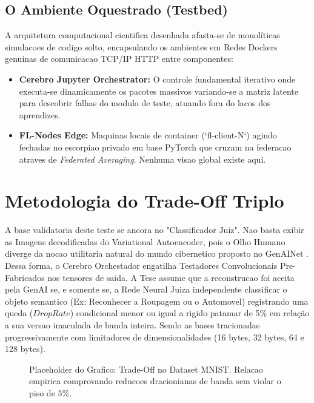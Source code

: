 \documentclass[conference]{IEEEtran}
\begin{document}
\subsection{O Ambiente Oquestrado (Testbed)}

A arquitetura computacional cientifica desenhada afasta-se de monolíticas simulacoes de codigo solto, encapsulando os ambientes em Redes Dockers genuinas de comunicacao TCP/IP HTTP entre componentes:
\begin{itemize}
    \item \textbf{Cerebro Jupyter Orchestrator:} O controle fundamental iterativo onde executa-se dinamicamente os pacotes massivos variando-se a matriz latente para descobrir falhas do modulo de teste, atuando fora do lacos dos aprendizes.
    \item \textbf{FL-Nodes Edge:} Maquinas locais de container (`fl-client-N`) agindo fechadas no escorpiao privado em base PyTorch que cruzam na federacao atraves de \textit{Federated Averaging}. Nenhuma visao global existe aqui.
\end{itemize}


\section{Metodologia do Trade-Off Triplo}

A base validatoria deste teste se ancora no "Classificador Juiz". Nao basta exibir as Imagens decodificadas do Variational Autoencoder, pois o Olho Humano diverge da nocao utilitaria natural do mundo cibernetico proposto no GenAINet \cite{du2023genainet}.
Dessa forma, o Cerebro Orchestador engatilha Testadores Convolucionais Pre-Fabricados nos tensores de saida. 
A Tese assume que a reconstrucao foi aceita pela GenAI se, e somente se, a Rede Neural Juiza independente classificar o objeto semantico (Ex: Reconhecer a Roupagem ou o Automovel) registrando uma queda ($Drop Rate$) condicional menor ou igual a rigido patamar de 5\% em relação a sua versao imaculada de banda inteira.
Sendo as bases tracionadas progressivamente com limitadores de dimensionalidades (16 bytes, 32 bytes, 64 e 128 bytes).

\begin{figure}[ht]
\centering
\caption{Placeholder do Grafico: Trade-Off no Dataset MNIST. Relacao empirica comprovando reducoes dracionianas de banda sem violar o piso de $5\%$.}
\label{fig:tradeoff_mnist}
\end{figure}
\end{document}
